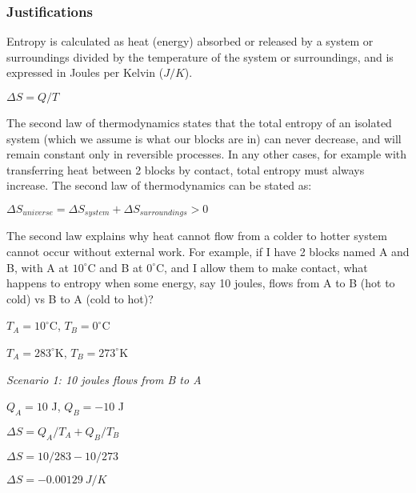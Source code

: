 \documentclass[12pt,letter]{article}
\begin{document}
\pagebreak

\subsubsection{Justifications}

Entropy is calculated as heat (energy) absorbed or released by a system or 
surroundings divided by the temperature of the system or surroundings, and is
expressed in Joules per Kelvin ($J/K$).

\bigskip

{\centering
    $\Delta S = Q / T$\par
}

\bigskip

The second law of thermodynamics states that the total entropy of an isolated
system (which we assume is what our blocks are in) can never decrease, and will
remain constant only in reversible processes. 
In any other cases, for example with transferring heat between 2 blocks by contact,
total entropy must always increase.
The second law of thermodynamics can be stated as:

\bigskip

{\centering
    $\Delta S_{universe} = \Delta S_{system} + \Delta S_{surroundings} > 0$\par
}

\bigskip

The second law explains why heat cannot flow from a colder to hotter system cannot
occur without external work. 
For example, if I have 2 blocks named A and B, with A at $10^{\circ}$C and B at
$0^{\circ}$C, and I allow them to make contact, what happens to entropy when some 
energy, say 10 joules, flows from A to B (hot to cold) vs B to A (cold to hot)?

\bigskip

{\centering
    $T_{A}=10^{\circ}$C, $T_{B}=0^{\circ}$C
    
    \bigskip

    $T_{A}=283^{\circ}$K, $T_{B}=273^{\circ}$K

}

\bigskip

\emph{Scenario 1: 10 joules flows from B to A}

\bigskip

{\centering
    $Q_A = 10$ J, $Q_B = -10$ J

    \bigskip

    $\Delta S = Q_A/T_A + Q_B/T_B$

    \bigskip

    $\Delta S = 10/283 - 10/273$

    \bigskip

    $\Delta S = -0.00129\ J/K$ 

}
\end{document}
